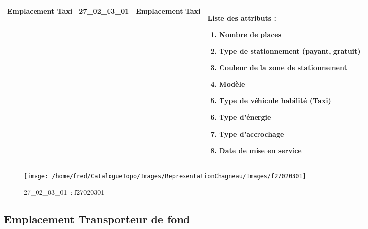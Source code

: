 \documentclass[12pt,titlepage]{book}
\begin{document}
\renewcommand{\arraystretch}{1.2}
\begin{supertabular}{|p{10cm}|c|p{13cm}|p{12cm}|}
 Emplacement Taxi & 27\_02\_03\_01 & Emplacement Taxi & Liste des attributs :
\begin{enumerate}
  \item Nombre de places  \item Type de stationnement (payant, gratuit)  \item Couleur de la zone de stationnement  \item Modèle  \item Type de véhicule habilité (Taxi)  \item Type d'énergie  \item Type d'accrochage  \item Date de mise en service\end{enumerate}
\\
\hline
\end{supertabular}
\begin{figure}[h!]
  \hfill         %
  \begin{minipage}[t]{3cm}
    \begin{center}
      \texttt{[image: /home/fred/CatalogueTopo/Images/RepresentationChagneau/Images/f27020301]}
      \caption[~27\_02\_03\_01]{\small{27\_02\_03\_01~:} \tiny{f27020301}}\label{f27020301}
    \end{center}
  \end{minipage}
\end{figure}


\subsection{Emplacement Transporteur de fond}
\noindent
\vspace{\baselineskip}
\end{document}
